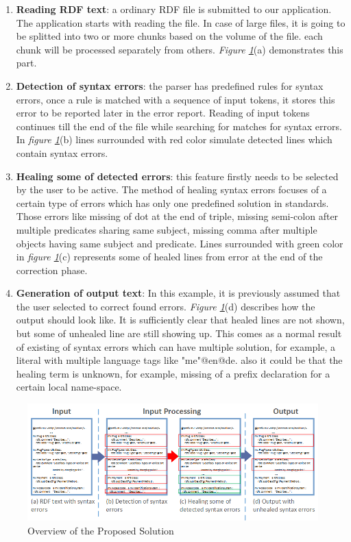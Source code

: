  \begin{enumerate}[label=(\alph*)]
\item \textbf{Reading RDF text}: a ordinary RDF file is submitted to our application. The application starts with reading the file. In case of large files, it is going to be splitted into two or more chunks based on the volume of the file. each chunk will be processed separately from others.  {\it Figure \ref{Fig:Approach}}(a) demonstrates this part. 
\item \textbf{Detection of syntax errors}: the parser has predefined rules for syntax errors, once a rule is matched with a sequence of input tokens, it stores this error to be reported later in the error report. Reading of input tokens continues till the end of the file while searching for matches for syntax errors. In  {\it figure \ref{Fig:Approach}}(b) lines surrounded with red color simulate detected lines which contain syntax errors. 
\item \textbf {Healing some of detected errors}: this feature firstly needs to be selected by the user to be active. The method of healing syntax errors focuses of a certain type of errors which has only one predefined solution in standards. Those errors like missing of dot at the end of triple, missing semi-colon after multiple predicates sharing same subject, missing comma after multiple objects having same subject and predicate. Lines surrounded with green color in {\it figure \ref{Fig:Approach}}(c) represents some of healed lines from error at the end of the correction phase.  
\item\textbf {Generation of output text}: In this example, it is previously assumed that the user selected to correct found errors.  {\it Figure \ref{Fig:Approach}}(d) describes how the output should look like. It is sufficiently clear that healed lines are not shown, but some of unhealed line are still showing up. This comes as a normal result of existing of syntax errors which can have multiple solution, for example, a literal with multiple language tags like "me"@en@de. also it could be that the healing term is unknown, for example, missing of a prefix declaration for a certain local name-space. 
\end{enumerate} 

\begin{figure}
	\centering
	  	\includegraphics[width=13cm]{images/Approach.png}
		\caption{Overview of the Proposed Solution}
		\label{Fig:Approach}  
\end{figure}
